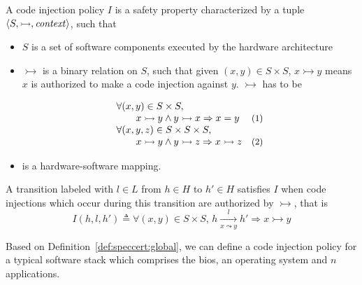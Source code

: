 \begin{definition}
  \label{def:speccert:global}

  A code injection policy \( I \) is a safety property characterized by a tuple
  \( \langle S, \rightarrowtail, \mathit{context} \rangle \), such that
  \begin{itemize}
  \item \( S \) is a set of software components executed by the hardware
    architecture
  \item \( \rightarrowtail \) is a binary relation on \( S \), such that given
    \( (x, y) \in S \times S \), \( x \rightarrowtail y \) means \( x \) is
    authorized to make a code injection against \( y \).
    \( \rightarrowtail \) has to be
    \[
      \begin{array}{lr}
        \forall (x, y) \in S \times S,
        & \\
        \qquad x \rightarrowtail y \wedge y
        \rightarrowtail x \Rightarrow x = y
        & \text{\small (1)} \\
        \forall (x, y, z) \in S \times S \times S,
        & \\
        \qquad x \rightarrowtail y \wedge y
        \rightarrowtail z \Rightarrow x \rightarrowtail z
        & \text{\small (2)}
      \end{array}
    \]
  \item {} is a hardware-software mapping.
  \end{itemize}

  A transition labeled with \( l \in L \) from \( h \in H \) to \( h' \in H \)
  satisfies \( I \) when code injections which occur during this transition are
  authorized by \( \rightarrowtail \), that is
  \[
    I(h, l, h') \triangleq \forall (x, y) \in S \times S \text{, } h
    \xrightarrow[x \leadsto y]{l} h' \Rightarrow x \rightarrowtail y
  \]
\end{definition}

Based on Definition~\ref{def:speccert:global}, we can define a code injection
policy for a typical software stack which comprises the \ac{bios}, an operating
system and \( n \) applications.

